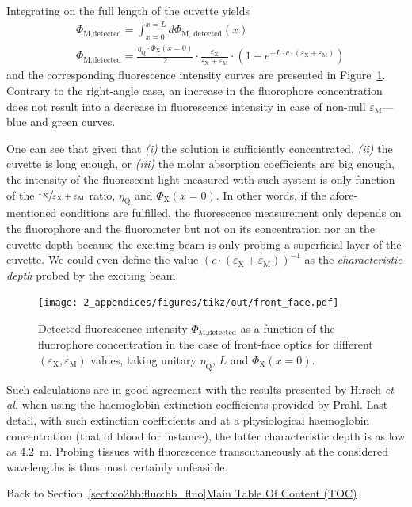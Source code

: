 Integrating on the full length of the cuvette yields
\begin{equation}
	\begin{split}
		&\Phi_\text{M,detected} = \int_{x=0}^{x=L} d\Phi_\text{M, detected}(x) \\
		&\Phi_\text{M,detected} = \frac{\eta_\text{Q} \cdot \Phi_\text{X}(x=0)}{2} \cdot \frac{\varepsilon_\text{X} }{\varepsilon_\text{X} + \varepsilon_\text{M}} \cdot (1-e^{-L\cdot c \cdot (\varepsilon_\text{X} + \varepsilon_\text{M})})
	\end{split}
\end{equation}
and the corresponding fluorescence intensity curves are presented in Figure~\ref{annfig:fluo_quenching:fluo_front_curves}. Contrary to the right-angle case, an increase in the fluorophore concentration does not result into a decrease in fluorescence intensity in case of non-null $\varepsilon_\text{M}$---blue and green curves.

One can see that given that \emph{(i)} the solution is sufficiently concentrated, \emph{(ii)} the cuvette is long enough, or \emph{(iii)} the molar absorption coefficients are big enough, the intensity of the fluorescent light measured with such system is only function of the $\sfrac{\varepsilon_\text{X}}{\varepsilon_\text{X} + \varepsilon_\text{M}}$ ratio, $\eta_\text{Q}$ and $\Phi_\text{X}(x=0)$. In other words, if the afore-mentioned conditions are fulfilled, the fluorescence measurement only depends on the fluorophore and the fluorometer but not on its concentration nor on the cuvette depth because the exciting beam is only probing a superficial layer of the cuvette. We could even define the value $(c\cdot(\varepsilon_\text{X} + \varepsilon_\text{M}))^{-1}$ as the \emph{characteristic depth} probed by the exciting beam.

\begin{figure}
	\centering
	\texttt{[image: 2\_appendices/figures/tikz/out/front\_face.pdf]}
	\caption[Detected fluorescence intensity in the front-face optics case.]{Detected fluorescence intensity $\Phi_\text{M,detected}$ as a function of the fluorophore concentration in the case of front-face optics for different $(\varepsilon_\text{X},\varepsilon_\text{M})$ values, taking unitary $\eta_\text{Q}$, $L$ and $\Phi_\text{X}(x=0)$.}
	\label{annfig:fluo_quenching:fluo_front_curves}
\end{figure}

Such calculations are in good agreement with the results presented by Hirsch \textit{et al.}\cite{hirsch1980} when using the haemoglobin extinction coefficients provided by Prahl\cite{prahl1998}. Last detail, with such extinction coefficients and at a physiological haemoglobin concentration (that of blood for instance), the latter characteristic depth is as low as 4.2~{\textmu}m. Probing tissues with fluorescence transcutaneously at the considered wavelengths is thus most certainly unfeasible.

\begin{appbox}
	Back to Section~\ref{sect:co2hb:fluo:hb_fluo}\hfill \hyperref[chapter:toc]{Main Table Of Content (TOC)}
\end{appbox}